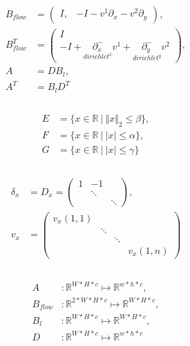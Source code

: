 \documentclass[A4,12pt]{article}
\DeclareMathOperator*{\argmin}{arg\,min}
\newcommand{\R}{\mathbb{R}}
\newcommand{\norm}[1]{\Vert #1 \Vert}
\begin{document}
\\
\begin{equation}
\begin{aligned}
B_{flow}&=\begin{pmatrix}I, &-I-v^1\partial_x-v^2\partial_y\end{pmatrix}, \\
B_{flow}^T&=\begin{pmatrix}I \\ -I+\underset{dirichlet^x} {\partial^-_x} v^1+\underset{dirichlet^y} {\partial^-_y} v^2\end{pmatrix}, \\
A&=DB_l, \\
A^T&=B_lD^T \\
\end{aligned}
\end{equation}
\\
\begin{equation}
\begin{aligned}
E &= \{x \in \R ~|~ \norm{x}_2 \leq \beta \}, \\
F &= \{x \in \R ~|~ |x| \leq \alpha \}, \\
G &= \{x \in \R ~|~ |x| \leq \gamma \} \\
\end{aligned}
\end{equation}
\\
\begin{equation}
\begin{aligned}
\delta_x&=D_x=\begin{pmatrix}1 & -1 & \\ & \ddots & \\ & & \ddots \end{pmatrix}, \\
v_x&=\begin{pmatrix}v_x(1,1)& & & \\ & \ddots & & \\ & & \ddots & \\ & & & v_x(1,n) \end{pmatrix}  \\
\end{aligned}
\end{equation}
\\
\begin{equation}
\begin{aligned}
A&\colon\R^{W*H*c}\mapsto\R^{w*h*c}, \\
B_{flow}&\colon\R^{2*W*H*c}\mapsto\R^{W*H*c}, \\
B_l&\colon\R^{W*H*c}\mapsto\R^{W*H*c}, \\
D&\colon\R^{W*H*c}\mapsto\R^{w*h*c} \\
\end{aligned}
\end{equation}



\end{document}
